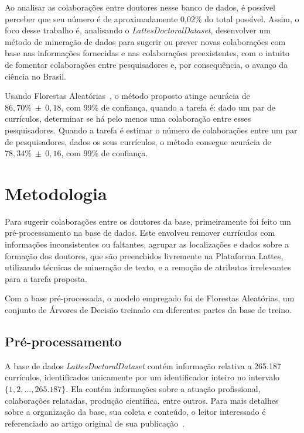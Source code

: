 \documentclass[12pt]{article}
\begin{document}
Ao analisar as colaborações entre doutores nesse banco de dados, é possível perceber que seu número é de aproximadamente 0,02\% do total possível.
Assim, o foco desse trabalho é, analisando o \emph{LattesDoctoralDataset}, desenvolver um método de mineração de dados para sugerir ou prever novas colaborações com base nas informações fornecidas e nas colaborações preexistentes, com o intuito de fomentar colaborações entre pesquisadores e, por consequência, o avanço da ciência no Brasil.

Usando Florestas Aleatórias~\cite{random-forests}, o método proposto atinge acurácia de $86,70\%~\pm~0,18$, com 99\% de confiança, quando a tarefa é: dado um par de currículos, determinar se há pelo menos uma colaboração entre esses pesquisadores.
Quando a tarefa é estimar o número de colaborações entre um par de pesquisadores, dados os seus currículos, o método consegue acurácia de $78,34\%~\pm~0,16$, com 99\% de confiança.

\section{Metodologia}
\label{sec:methods}

Para sugerir colaborações entre os doutores da base, primeiramente foi feito um pré-processamento na base de dados.
Este envolveu remover currículos com informações inconsistentes ou faltantes, agrupar as localizações e dados sobre a formação dos doutores, que são preenchidos livremente na Plataforma Lattes, utilizando técnicas de mineração de texto, e a remoção de atributos irrelevantes para a tarefa proposta.

Com a base pré-processada, o modelo empregado foi de Florestas Aleatórias, um conjunto de Árvores de Decisão treinado em diferentes partes da base de treino.

\subsection{Pré-processamento}
\label{sec:preprocess}

A base de dados \emph{LattesDoctoralDataset} contém informação relativa a 265.187 currículos, identificados unicamente por um identificador inteiro no intervalo $\{1, 2, ..., 265.187\}$.
Ela contém informações sobre a atuação profissional, colaborações relatadas, produção científica, entre outros.
Para mais detalhes sobre a organização da base, sua coleta e conteúdo, o leitor interessado é referenciado ao artigo original de sua publicação~\cite{lattes-dataset}.
\end{document}

